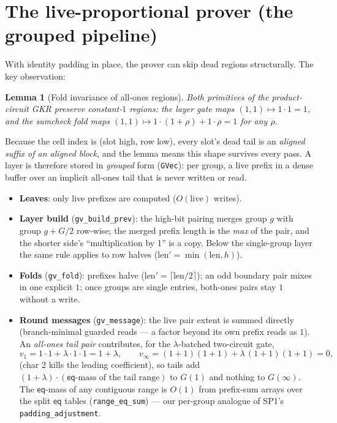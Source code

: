 \documentclass[11pt]{article}
\newcommand{\eq}{\mathsf{eq}}
\newcommand{\code}[1]{\texttt{#1}}
\newtheorem{lemma}{Lemma}
\theoremstyle{definition}
\begin{document}
\section{The live-proportional prover (the grouped pipeline)}

With identity padding in place, the prover can skip dead regions
structurally. The key observation:

\begin{lemma}[Fold invariance of all-ones regions]
Both primitives of the product-circuit GKR preserve constant-$1$
regions: the layer gate maps $(1, 1) \mapsto 1 \cdot 1 = 1$, and the
sumcheck fold maps $(1, 1) \mapsto 1\cdot(1{+}\rho) + 1\cdot\rho = 1$
for any $\rho$.
\end{lemma}

Because the cell index is (slot high, row low), every slot's dead tail
is an \emph{aligned suffix of an aligned block}, and the lemma means
this shape survives every pass. A layer is therefore stored in
\emph{grouped} form (\code{GVec}): per group, a live prefix in a dense
buffer over an implicit all-ones tail that is never written or read.

\begin{itemize}[leftmargin=2em]
\item \textbf{Leaves}: only live prefixes are computed
  ($O(\mathrm{live})$ writes).
\item \textbf{Layer build} (\code{gv\_build\_prev}): the high-bit
  pairing merges group $g$ with group $g + G/2$ row-wise; the merged
  prefix length is the \emph{max} of the pair, and the shorter side's
  ``multiplication by 1'' is a copy. Below the single-group layer the
  same rule applies to row halves ($\mathrm{len}' = \min(\mathrm{len}, h)$).
\item \textbf{Folds} (\code{gv\_fold}): prefixes halve
  ($\mathrm{len}' = \lceil \mathrm{len}/2 \rceil$); an odd boundary pair
  mixes in one explicit $1$; once groups are single entries, both-ones
  pairs stay $1$ without a write.
\item \textbf{Round messages} (\code{gv\_message}): the live pair extent
  is summed directly (branch-minimal guarded reads --- a factor beyond
  its own prefix reads as $1$). An \emph{all-ones tail pair} contributes,
  for the $\lambda$-batched two-circuit gate,
  \[
  v_1 = 1\cdot 1 + \lambda\cdot 1\cdot 1 = 1 + \lambda,
  \qquad
  v_\infty = (1{+}1)(1{+}1) + \lambda\,(1{+}1)(1{+}1) = 0,
  \]
  (char 2 kills the leading coefficient), so tails add
  $(1{+}\lambda)\cdot(\text{$\eq$-mass of the tail range})$ to $G(1)$
  and nothing to $G(\infty)$. The $\eq$-mass of any contiguous range is
  $O(1)$ from prefix-sum arrays over the split $\eq$ tables
  (\code{range\_eq\_sum}) --- our per-group analogue of SP1's
  \code{padding\_adjustment}.
\end{itemize}
\end{document}
